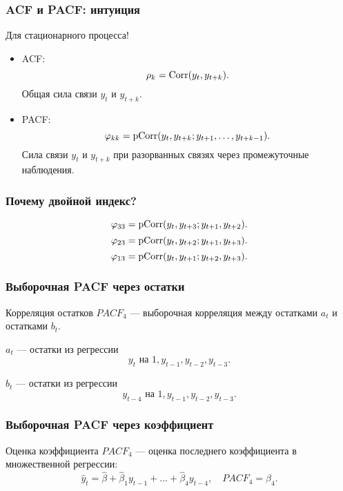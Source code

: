 \begin{frame}
  \frametitle{ACF и PACF: интуиция}

  Для \alert{стационарного процесса}!

  \begin{itemize}
    \item ACF:
    \[
      \rho_k = \operatorname{Corr}(y_t, y_{t+k}).
    \]
    \alert{Общая сила} связи $y_t$ и $y_{t+k}$.
    \item PACF:
    \[
      \varphi_{kk} = \operatorname{pCorr}(y_t, y_{t+k}; y_{t+1}, \ldots, y_{t+k-1}).
    \]
    \alert{Сила} связи $y_t$ и $y_{t+k}$ при \alert{разорванных} связях через промежуточные наблюдения.
  \end{itemize}
\end{frame}

\begin{frame}
  \frametitle{Почему двойной индекс?}

  \[
  \varphi_{33} = \operatorname{pCorr}(y_t, y_{t+3}; y_{t+1}, y_{t+2}).  
  \]
  \pause
  \[
  \varphi_{23} = \operatorname{pCorr}(y_t, y_{t+2}; y_{t+1}, y_{t+3}).  
  \]
  \pause
  \[
  \varphi_{13} = \operatorname{pCorr}(y_t, y_{t+1}; y_{t+2}, y_{t+3}).  
  \]
\end{frame}

\begin{frame}
  \frametitle{Выборочная PACF через остатки}

  \begin{block}{Корреляция остатков}
    $PACF_4$ — выборочная корреляция \alert{между остатками} $a_t$ и остатками $b_t$.

    $a_t$ — остатки из регрессии
    \[
      y_t \text{ на } 1, y_{t-1}, y_{t-2}, y_{t-3}.
    \]

    $b_t$ — остатки из регрессии
    \[
      y_{t-4} \text{ на } 1, y_{t-1}, y_{t-2}, y_{t-3}.
    \]
  \end{block}
\end{frame}


\begin{frame}
  \frametitle{Выборочная PACF через коэффициент}

  \begin{block}{Оценка коэффициента}
    $PACF_4$ — оценка \alert{последнего коэффициента} в множественной регрессии:
      \[
        \hat y_t = \hat\beta + \hat\beta_1 y_{t-1} + \ldots + \hat\beta_4 y_{t-4}, \quad PACF_4 = \hat\beta_4.
      \]
  \end{block}

\end{frame}

